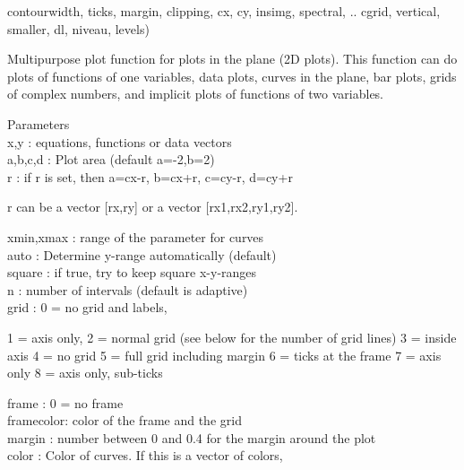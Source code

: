 \documentclass[a4paper,10pt]{article}
\begin{document}
\begin{eulernotebook}
\begin{eulercomment}
\begin{eulercomment}
\begin{eulercomment}
\begin{eulercomment}
\begin{eulercomment}
\begin{eulercomment}
\begin{eulerttcomment}
  contourwidth, ticks, margin, clipping, cx, cy, insimg, spectral,  ..
  cgrid, vertical, smaller, dl, niveau, levels)
\end{eulerttcomment}
\begin{eulercomment}
Multipurpose plot function for plots in the plane (2D plots). This function can do
plots of functions of one variables, data plots, curves in the plane, bar plots, grids
of complex numbers, and implicit plots of functions of two variables.

Parameters
\\
x,y       : equations, functions or data vectors\\
a,b,c,d   : Plot area (default a=-2,b=2)\\
r         : if r is set, then a=cx-r, b=cx+r, c=cy-r, d=cy+r\\
\end{eulercomment}
\begin{eulerttcomment}
            r can be a vector [rx,ry] or a vector [rx1,rx2,ry1,ry2].
\end{eulerttcomment}
\begin{eulercomment}
xmin,xmax : range of the parameter for curves\\
auto      : Determine y-range automatically (default)\\
square    : if true, try to keep square x-y-ranges\\
n         : number of intervals (default is adaptive)\\
grid      : 0 = no grid and labels,\\
\end{eulercomment}
\begin{eulerttcomment}
            1 = axis only,
            2 = normal grid (see below for the number of grid lines)
            3 = inside axis
            4 = no grid
            5 = full grid including margin
            6 = ticks at the frame
            7 = axis only
            8 = axis only, sub-ticks
\end{eulerttcomment}
\begin{eulercomment}
frame     : 0 = no frame\\
framecolor: color of the frame and the grid\\
margin    : number between 0 and 0.4 for the margin around the plot\\
color     : Color of curves. If this is a vector of colors,\\
\end{eulercomment}
\begin{eulerttcomment}

\end{eulerttcomment}
\end{eulercomment}
\end{eulercomment}
\end{eulercomment}
\end{eulercomment}
\end{eulercomment}
\end{eulercomment}
\end{eulernotebook}
\end{document}
